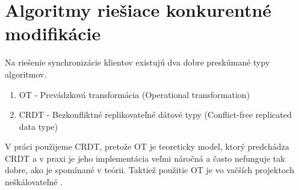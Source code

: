 \section{Algoritmy riešiace konkurentné modifikácie}
Na riešenie synchronizácie klientov existujú dva dobre preskúmané typy algoritmov.
\begin{enumerate}
  \item OT - Prevádzková transformácia (Operational transformation)
  \item CRDT - Bezkonfliktné replikovateľné dátové typy (Conflict-free replicated data type)
\end{enumerate}

V práci použijeme CRDT, pretože OT je teoreticky model, ktorý predchádza CRDT a v praxi
je jeho implementácia veľmi náročná a často nefunguje tak dobre, ako je spomínané v teórii.
Taktiež použitie OT je vo vačších projektoch neškálovateľné \cite{ot_nonscalable}. 
